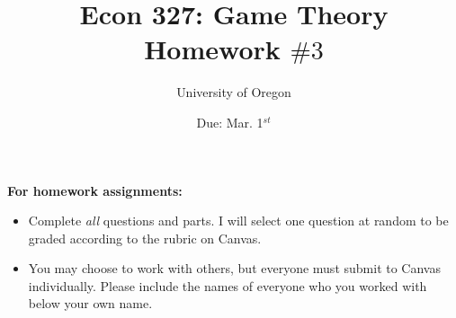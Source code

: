 \documentclass[addpoints ]{exam}
\title{
    \textbf{Econ 327: Game Theory} \\ 
    Homework $\#3$
    }
\author{University of Oregon}
\date{Due: Mar. 1$^{st}$}
\begin{document}
\maketitle

\begin{center}
  \gradetable[h][questions]
\end{center}

\vspace{0.5in}

\begin{center}
  \textbf{For homework assignments:}
\end{center}

\begin{itemize}


  \item Complete \textit{all} questions and parts.
  I will select one question at random to be graded
  according to the rubric on Canvas.

  \item You may choose to work with others,
  but everyone must submit to Canvas individually.
  Please include the names of everyone who you worked with 
  below your own name.
 
\end{itemize}

\vspace{1.0in}


\vspace{0.5in}

\begin{center}
\end{center}

\newpage
\end{document}
